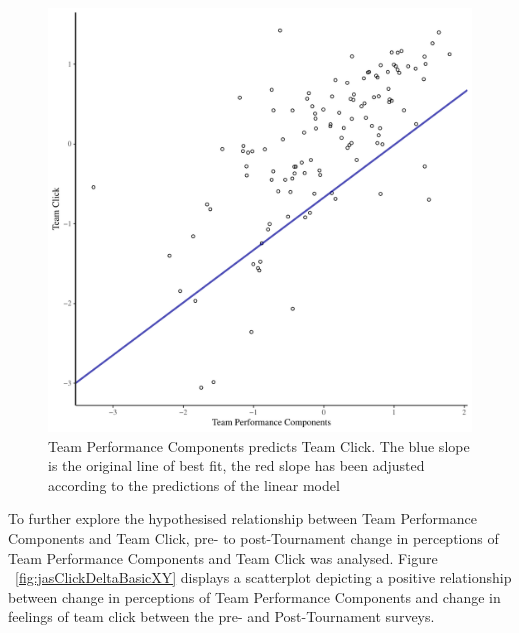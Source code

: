 \begin{CJK}{UTF8}{gbsn}



\begin{figure}[htbp]
  \centering
\includegraphics[scale = .5]{images/jasClickModelSlope}
  \caption{Team Performance Components predicts Team Click. The blue slope is the original line of best fit, the red slope has been adjusted according to the predictions of the linear model}
  \label{fig:jasClickModelSLope}
\end{figure}



To further explore the hypothesised relationship between Team Performance Components and Team Click, pre- to post-Tournament change in perceptions of Team Performance Components and Team Click was analysed.  Figure ~\ref{fig:jasClickDeltaBasicXY} displays a scatterplot depicting a positive relationship between change in perceptions of Team Performance Components and change in feelings of team click between the pre- and Post-Tournament surveys.


\end{CJK}
